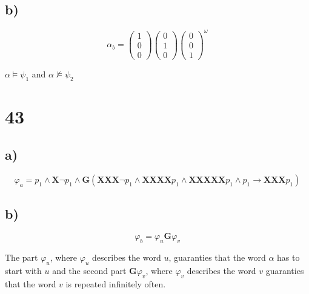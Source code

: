 \documentclass[10pt]{article}
\begin{document}
  \subsection*{b)}
    \begin{displaymath}
      \alpha_{b}= \left(\begin{array}{c}1\\0\\0\end{array}\right)
                  \left(\begin{array}{c}0\\1\\0\end{array}\right)
                  \left(\begin{array}{c}0\\0\\1\end{array}\right)^\omega
    \end{displaymath}
    \begin{center}
      $\alpha \models \psi_1$ and $\alpha \not\models \psi_2$
    \end{center}

\section*{43}
  \subsection*{a)}
    \begin{displaymath}
      \varphi_{a}=  p_1 \land \textbf{X}\neg p_1\land
                    \textbf{G}(\textbf{XXX}\neg p_1 
                          \land \textbf{XXXX}p_1 
                          \land \textbf{XXXXX}p_1
                          \land p_1 \rightarrow \textbf{XXX}p_1)
    \end{displaymath}

  \subsection*{b)}
    \begin{displaymath}
      \varphi_{b}=\varphi_{u}\textbf{G}\varphi_{v}
    \end{displaymath}
  
    The part $\varphi_{u}$, where $\varphi_{u}$ describes the word $u$, guaranties 
    that the word $\alpha$ has to start with $u$ and the second part 
    $\textbf{G}\varphi_{v}$, where $\varphi_{v}$ describes the word $v$
    guaranties that the word $v$ is repeated infinitely often.
    
    
\end{document}
